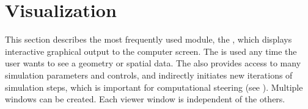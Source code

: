 \newcommand{\rakewidget}{%
  \centerline{\includegraphics[bb=0 0 457 340,height=2in]
    {Figures/widget-gauge.eps.gz}}
}
\begin{htmlonly}
  \newcommand{\rakewidget}{%
    \htmladdimg[alt="rakewidget"]{../Figures/widget-gauge.gif}
  }
\end{htmlonly}

\newcommand{\framewidget}{%
  \centerline{\includegraphics[bb=0 0 328 268,height=2in]
    {Figures/widget-frame.eps.gz}}
}
\begin{htmlonly}
  \newcommand{\framewidget}{%
  \htmladdimg[alt="framewidget"]{../Figures/widget-frame.gif}}
\end{htmlonly}

\newcommand{\boxwidget}{%
  \centerline{\includegraphics[bb=0 0 458 342,height=2in]
    {Figures/widget-box.eps.gz}}
}
\begin{htmlonly}
  \newcommand{\boxwidget}{%
    \htmladdimg[alt="boxwidget"]{../Figures/widget-box.gif}
  }
\end{htmlonly}

\newcommand{\ringwidget}{%
  \centerline{\includegraphics[bb=0 0 507 467,height=2in]
  {Figures/widget-ring.eps.gz}}
}
\begin{htmlonly}
  \newcommand{\ringwidget}{%
    \htmladdimg[alt="ringwidget"] {../Figures/widget-ring.gif}
  }
\end{htmlonly}

\newcommand{\recordmoviewin}{%
  \centerline{\includegraphics[bb=0 0 176 183]
    {Figures/record_movie_win.eps.gz}}
}
\begin{htmlonly}
  \newcommand{\recordmoviewin}{%
  \htmladdimg[alt="Movie Recording
  Dialog"]{../Figures/record_movie_win.gif}
}
\end{htmlonly}

\newcommand{\graphics}{\emph{Graphics}}

\chapter{Visualization}
\label{ch:viewer}

This section describes the most frequently used \sr{} module,
the \viewer{}, which displays interactive graphical
output to the computer screen.  The \viewer{} is used any time the user
wants to see a geometry or spatial data. The \viewer{} also provides access to
many simulation parameters and controls, and indirectly initiates new
iterations of  simulation steps, which is important for computational
steering (see ).
Multiple \viewer{} windows can be created.  Each viewer window is
independent of the others.

